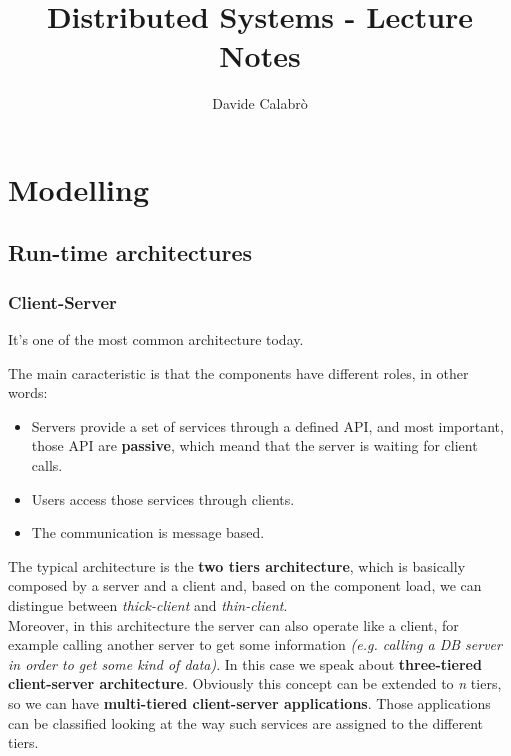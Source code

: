 \documentclass{article}
\title{Distributed Systems - Lecture Notes}
\author{Davide Calabrò}
\begin{document}
    \maketitle
    \newpage
    \section{Modelling}
    \subsection{Run-time architectures}

    \subsubsection{Client-Server}
    It's one of the most common architecture today.

    The main caracteristic is that the components have different roles, in other words: 
    \begin{itemize}
        \item Servers provide a set of services through a defined API, and most important, those API are \textbf{passive}, which meand that the server is waiting for client calls.
        \item Users access those services through clients.
        \item The communication is message based.
    \end{itemize}

    The typical architecture is the \textbf{two tiers architecture}, which is basically
    composed by a server and a client and, based on the component load, we can distingue between
    \textit{thick-client} and \textit{thin-client}.\\
    Moreover, in this architecture the server can also operate like a client, 
    for example calling another server to get some information 
    \textit{(e.g. calling a DB server in order to get some kind of data)}. 
    In this case we speak about \textbf{three-tiered client-server architecture}. 
    Obviously this concept can be extended to \textit{n} tiers, so we can have \textbf{multi-tiered client-server applications}.
    Those applications can be classified looking at the way such services are assigned to the different tiers.
\end{document}
